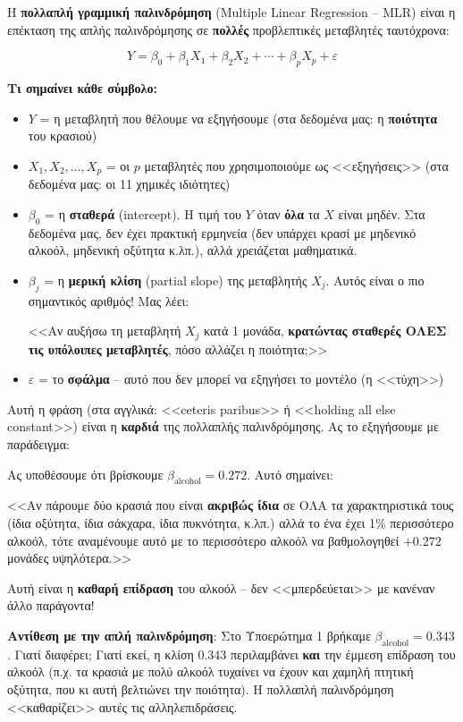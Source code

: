 \documentclass[12pt,a4paper]{article}
\begin{document}
\begin{theorybox}
Η \textbf{πολλαπλή γραμμική παλινδρόμηση} (Multiple Linear Regression -- MLR) είναι η επέκταση της απλής παλινδρόμησης σε \textbf{πολλές} προβλεπτικές μεταβλητές ταυτόχρονα:

\begin{equation}
Y = \beta_0 + \beta_1 X_1 + \beta_2 X_2 + \cdots + \beta_p X_p + \varepsilon
\end{equation}

\textbf{Τι σημαίνει κάθε σύμβολο:}
\begin{itemize}
    \item $Y$ = η μεταβλητή που θέλουμε να εξηγήσουμε (στα δεδομένα μας: η \textbf{ποιότητα} του κρασιού)
    \item $X_1, X_2, \ldots, X_p$ = οι $p$ μεταβλητές που χρησιμοποιούμε ως <<εξηγήσεις>> (στα δεδομένα μας: οι 11 χημικές ιδιότητες)
    \item $\beta_0$ = η \textbf{σταθερά} (intercept). Η τιμή του $Y$ όταν \textbf{όλα} τα $X$ είναι μηδέν. Στα δεδομένα μας, δεν έχει πρακτική ερμηνεία (δεν υπάρχει κρασί με μηδενικό αλκοόλ, μηδενική οξύτητα κ.λπ.), αλλά χρειάζεται μαθηματικά.
    \item $\beta_j$ = η \textbf{μερική κλίση} (partial slope) της μεταβλητής $X_j$. Αυτός είναι ο πιο σημαντικός αριθμός! Μας λέει:

    <<Αν αυξήσω τη μεταβλητή $X_j$ κατά 1 μονάδα, \textbf{κρατώντας σταθερές ΟΛΕΣ τις υπόλοιπες μεταβλητές}, πόσο αλλάζει η ποιότητα;>>

    \item $\varepsilon$ = το \textbf{σφάλμα} -- αυτό που δεν μπορεί να εξηγήσει το μοντέλο (η <<τύχη>>)
\end{itemize}
\end{theorybox}

\begin{examplebox}
Αυτή η φράση (στα αγγλικά: <<ceteris paribus>> ή <<holding all else constant>>) είναι η \textbf{καρδιά} της πολλαπλής παλινδρόμησης. Ας το εξηγήσουμε με παράδειγμα:

Ας υποθέσουμε ότι βρίσκουμε $\beta_{\text{alcohol}} = 0.272$. Αυτό σημαίνει:

<<Αν πάρουμε δύο κρασιά που είναι \textbf{ακριβώς ίδια} σε ΟΛΑ τα χαρακτηριστικά τους (ίδια οξύτητα, ίδια σάκχαρα, ίδια πυκνότητα, κ.λπ.) αλλά το ένα έχει 1\% περισσότερο αλκοόλ, τότε αναμένουμε αυτό με το περισσότερο αλκοόλ να βαθμολογηθεί $+0.272$ μονάδες υψηλότερα.>>

Αυτή είναι η \textbf{καθαρή επίδραση} του αλκοόλ -- δεν <<μπερδεύεται>> με κανέναν άλλο παράγοντα!

\textbf{Αντίθεση με την απλή παλινδρόμηση}: Στο Υποερώτημα 1 βρήκαμε $\beta_{\text{alcohol}} = 0.343$. Γιατί διαφέρει; Γιατί εκεί, η κλίση 0.343 περιλαμβάνει \textbf{και} την έμμεση επίδραση του αλκοόλ (π.χ. τα κρασιά με πολύ αλκοόλ τυχαίνει να έχουν και χαμηλή πτητική οξύτητα, που κι αυτή βελτιώνει την ποιότητα). Η πολλαπλή παλινδρόμηση <<καθαρίζει>> αυτές τις αλληλεπιδράσεις.
\end{examplebox}
\end{document}
